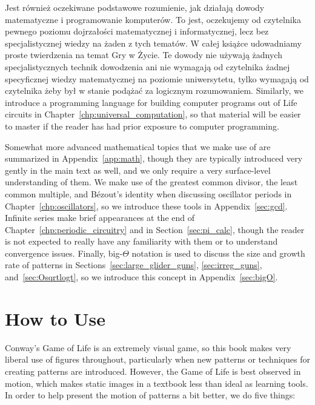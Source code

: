 Jest również oczekiwane podstawowe rozumienie, jak działają dowody matematyczne i programowanie komputerów. To jest, oczekujemy od czytelnika pewnego poziomu dojrzałości matematycznej i informatycznej, lecz bez specjalistycznej wiedzy na żaden z tych tematów. W całej książce udowadniamy proste twierdzenia na temat Gry w Życie. Te dowody nie używają żadnych specjalistycznych technik dowodzenia ani nie wymagają od czytelnika żadnej specyficznej wiedzy matematycznej na poziomie uniwersytetu, tylko wymagają od czytelnika żeby był w stanie podążać za logicznym rozumowaniem. Similarly, we introduce a programming language for building computer programs out of Life circuits in Chapter~\ref{chp:universal_computation}, so that material will be easier to master if the reader has had prior exposure to computer programming.

Somewhat more advanced mathematical topics that we make use of are summarized in Appendix~\ref{app:math}, though they are typically introduced very gently in the main text as well, and we only require a very surface-level understanding of them. We make use of the greatest common divisor, the least common multiple, and B\'ezout's identity when discussing oscillator periods in Chapter~\ref{chp:oscillators}, so we introduce these tools in Appendix~\ref{sec:gcd}. Infinite series make brief appearances at the end of Chapter~\ref{chp:periodic_circuitry} and in Section~\ref{sec:pi_calc}, though the reader is not expected to really have any familiarity with them or to understand convergence issues. Finally, big-$\Theta$ notation is used to discuss the size and growth rate of patterns in Sections~\ref{sec:large_glider_guns}, \ref{sec:irreg_guns}, and~\ref{sec:Osqrtlogt}, so we introduce this concept in Appendix~\ref{sec:bigO}.


\section*{How to Use}

Conway's Game of Life is an extremely visual game, so this book makes very liberal use of figures throughout, particularly when new patterns or techniques for creating patterns are introduced. However, the Game of Life is best observed in motion, which makes static images in a textbook less than ideal as learning tools. In order to help present the motion of patterns a bit better, we do five things:\medskip

